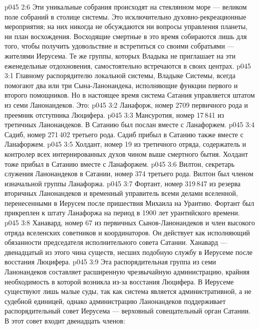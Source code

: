 \vs p045 2:6 Эти уникальные собрания происходят на стеклянном море --- великом поле собраний в столице системы. Это исключительно духовно\hyp{}рекреационные мероприятия; на них никогда не обсуждаются ни вопросы управления планеты, ни план восхождения. Восходящие смертные в это время собираются лишь для того, чтобы получить удовольствие и встретиться со своими собратьями --- жителями Иерусема. Те же группы, которых Владыка не приглашает на эти еженедельные отдохновения, самостоятельно встречаются в своих центрах.
\vs p045 3:1 Главному распорядителю локальной системы, Владыке Системы, всегда помогают два или три Сына\hyp{}Ланонандека, исполняющие функции первого и второго помощников. Но в настоящее время система Сатания управляется штатом из семи Ланонандеков. Это:
\vs p045 3:2 \bibnobreakspace {} Ланафорж, номер 2709 первичного рода и преемник отступника Люцифера.
\vs p045 3:3 \bibnobreakspace {} Мансуротия, номер 17\,841 из третичных Ланонандеков. В Сатанию был послан вместе с Ланафоржем.
\vs p045 3:4 \bibnobreakspace {} Садиб, номер 271\,402 третьего рода. Садиб прибыл в Сатанию также вместе с Ланафоржем.
\vs p045 3:5 \bibnobreakspace {} Холдант, номер 19 из третичного отряда, содержатель и контролер всех интернированных духов чином выше смертного бытия. Холдант тоже прибыл в Сатанию вместе с Ланафоржем.
\vs p045 3:6 \bibnobreakspace {} Вилтон, секретарь служения Ланонандеков в Сатании, номер 374 третьего рода. Вилтон был членом изначальной группы Ланафоржа.
\vs p045 3:7 \bibnobreakspace {} Фортант, номер 319\,847 из резерва вторичных Ланонандеков и временный управитель всеми делами вселенной, перенесенными в Иерусем после пришествия Михаила на Урантию. Фортант был прикреплен к штату Ланафоржа на период в 1900 лет урантийского времени.
\vs p045 3:8 \bibnobreakspace {} Ханавард, номер 67 из первичных Сынов\hyp{}Ланонандеков и член высокого отряда вселенских советников и координаторов. Он действует как исполняющий обязанности председателя исполнительного совета Сатании. Ханавард --- двенадцатый из этого чина существ, несших подобную службу в Иерусеме после восстания Люцифера.
\vs p045 3:9 \pc Эта распорядительная группа из семи Ланонандеков составляет расширенную чрезвычайную администрацию, крайняя необходимость в которой возникла из\hyp{}за восстания Люцифера. В Иерусеме существуют лишь малые суды, так как система является административной, а не судебной единицей, однако администрацию Ланонандеков поддерживает распорядительный совет Иерусема --- верховный совещательный орган Сатании. В этот совет входит двенадцать членов:
